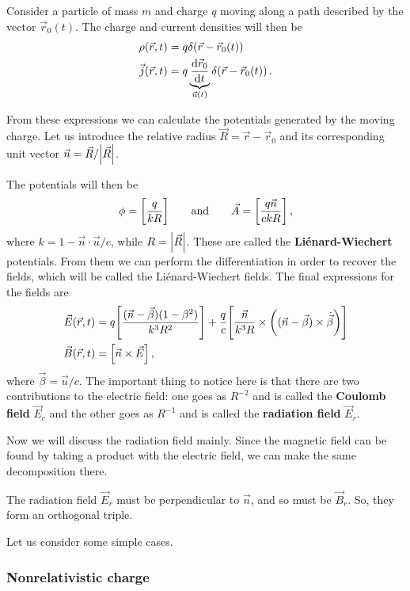 \documentclass[main.tex]{subfiles}
\begin{document}
Consider a particle of mass \(m\) and charge \(q\) moving along a path described by the vector \(\vec{r}_0 (t)\). The charge and current densities will then be 
%
\begin{align}
\rho (\vec{r}, t) &= q \delta (\vec{r} - \vec{r}_0(t)) \\
\vec{j} (\vec{r}, t) &= q \underbrace{\dv{\vec{r}_0}{t}}_{\vec{u}(t)} \delta (\vec{r} - \vec{r}_0(t))
\,.
\end{align}

From these expressions we can calculate the potentials generated by the moving charge. Let us introduce the relative radius \(\vec{R} = \vec{r} - \vec{r}_0\) and its corresponding unit vector \(\vec{n} = \vec{R} / \abs{\vec{R}}\). 

The potentials will then be 
%
\begin{align}
\phi = \qty[\frac{q}{kR}] \qquad \text{and} \qquad
\vec{A} = \qty[\frac{q \vec{n}}{ckR}]
\,,
\end{align}
%
where \(k = 1 - \vec{n} \cdot \vec{u} / c\), while \(R = \abs{\vec{R}}\).
These are called the \textbf{Liénard-Wiechert} potentials. 
From them we can perform the differentiation in order to recover the fields, which will be called the Liénard-Wiechert fields. 
The final expressions for the fields are 
%
\begin{align}
\vec{E} (\vec{r}, t) &= q \qty[\frac{(\vec{n} - \vec{\beta}) (1- \beta^2)}{ k^3 R^2}] + \frac{q}{c} \qty[\frac{\vec{n}}{k^3R} \times \qty((\vec{n} - \vec{\beta}) \times \dot{\vec{\beta}})] \\
\vec{B}(\vec{r}, t) &= \qty[\vec{n} \times \vec{E}]
\,,
\end{align}
%
where \(\vec{\beta} = \vec{u} / c\).
The important thing to notice here is that there are two contributions to the electric field: one goes as \(R^{-2}\) and is called the \textbf{Coulomb field} \(\vec{E}_c\) and the other goes as \(R^{-1}\) and is called the \textbf{radiation field} \(\vec{E}_r\).

Now we will discuss the radiation field mainly. Since the magnetic field can be found by taking a product with the electric field, we can make the same decomposition there.

The radiation field \(\vec{E}_r\) must be perpendicular to \(\vec{n}\), and so must be \(\vec{B}_r\). So, they form an orthogonal triple. 

Let us consider some simple cases. 

\subsubsection{Nonrelativistic charge}
\end{document}
